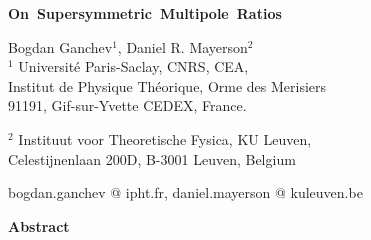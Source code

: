 \documentclass[12pt,a4paper]{article}
\begin{document}
\begin{titlepage}

\begin{flushright}
\small

\normalsize
\end{flushright}
\vspace{0.8 cm}

\begin{center}


\mbox{{\LARGE \textbf{On Supersymmetric Multipole Ratios}}}


\medskip

\vspace{1.2 cm} {\large Bogdan Ganchev$^1$, Daniel R. Mayerson$^{2}$}\\

\vspace{1cm} {$^1$ Universit\'e Paris-Saclay, CNRS, CEA,\\ Institut de Physique Th\'eorique, Orme des Merisiers\\ 91191, Gif-sur-Yvette CEDEX, France.}

\vspace{1cm} {$^2$ Instituut voor Theoretische Fysica, KU Leuven,\\ Celestijnenlaan 200D, B-3001 Leuven, Belgium}

 

 
\vspace{0.5cm}


\vspace{.5cm}
bogdan.ganchev @ ipht.fr, daniel.mayerson @ kuleuven.be

\vspace{2cm}

\textbf{Abstract}
\end{center}


\end{titlepage}
\end{document}
